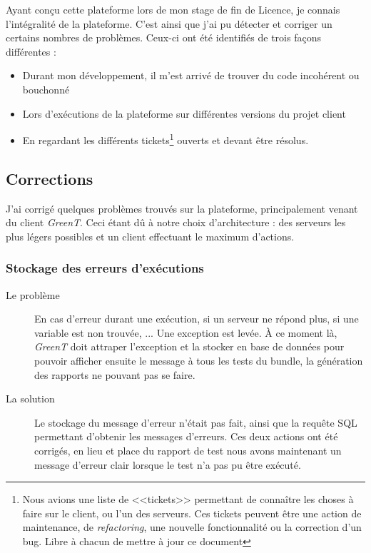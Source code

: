 Ayant conçu cette plateforme lors de mon stage de fin de Licence, je connais l'intégralité de la plateforme. C'est ainsi que j'ai pu détecter et corriger un certains nombres de problèmes. Ceux-ci ont été identifiés de trois façons différentes : 
\begin{itemize}
	\item Durant mon développement, il m'est arrivé de trouver du code incohérent ou bouchonné
	\item Lors d'exécutions de la plateforme sur différentes versions du projet client
	\item En regardant les différents tickets\footnote{Nous avions une liste de <<tickets>> permettant de connaître les choses à faire sur le client, ou l'un des serveurs. Ces tickets peuvent être une action de maintenance, de \textit{refactoring}, une nouvelle fonctionnalité ou la correction d'un bug. Libre à chacun de mettre à jour ce document} ouverts et devant être résolus.
\end{itemize}

\subsection{Corrections}
J'ai corrigé quelques problèmes trouvés sur la plateforme, principalement venant du client \textit{GreenT}. Ceci étant dû à notre choix d'architecture : des serveurs les plus légers possibles et un client effectuant le maximum d'actions.
	\subsubsection{Stockage des erreurs d'exécutions}
	\begin{description}
		\item[Le problème] En cas d'erreur durant une exécution, si un serveur ne répond plus, si une variable est non trouvée, ... Une exception est levée. À ce moment là, \textit{GreenT} doit attraper l'exception et la stocker en base de données pour pouvoir afficher ensuite le message à tous les tests du bundle, la génération des rapports ne pouvant pas se faire.
		\item[La solution] Le stockage du message d'erreur n'était pas fait, ainsi que la requête SQL permettant d'obtenir les messages d'erreurs. Ces deux actions ont été corrigés, en lieu et place du rapport de test nous avons maintenant un message d'erreur clair lorsque le test n'a pas pu être exécuté.
		\end{description}
		
